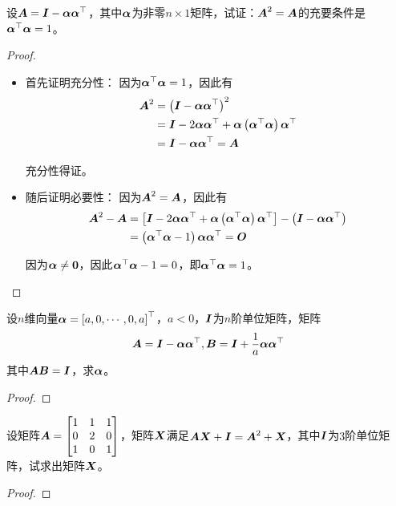\begin{problem}
设\(\mata=\mati-\vecal\vecal^\top\)，其中\(\vecal\)为非零\(n\times1\)矩阵，试证：\(\mata^2=\mata\)的充要条件是\(\vecal^\top\vecal=1\)。
\end{problem}
\begin{proof}
    \begin{itemize}
        \item 首先证明充分性：
              因为\(\vecal^\top\vecal=1\)，因此有
              \begin{align*}
                  \mata^2 & =\mypar{\mati-\vecal\vecal^\top}^2                                   \\
                          & =\mati-2\vecal\vecal^\top+\vecal\mypar{\vecal^\top\vecal}\vecal^\top \\
                          & =\mati-\vecal\vecal^\top=\mata
              \end{align*}

              充分性得证。

        \item 随后证明必要性：
              因为\(\mata^2=\mata\)，因此有
              \begin{align*}
                  \mata^2-\mata & =\mat{\mati-2\vecal\vecal^\top+\vecal\mypar{\vecal^\top\vecal}\vecal^\top}-\mypar{\mati-\vecal\vecal^\top} \\
                                & =\mypar{\vecal^\top\vecal-1}\vecal\vecal^\top=\mato
              \end{align*}

              因为\(\vecal\neq\veczero\)，因此\(\vecal^\top\vecal-1=0\)，即\(\vecal^\top\vecal=1\)。
    \end{itemize}
\end{proof}

\begin{problem}
设\(n\)维向量\(\vecal=\myvec{a,0,\cdots,0,a}\)，\(a<0\)，\(\mati\)为\(n\)阶单位矩阵，矩阵
\begin{equation*}
    \mata=\mati-\vecal\vecal^\top,\matb=\mati+\frac{1}{a}\vecal\vecal^\top
\end{equation*}
其中\(\mata\matb=\mati\)，求\(\vecal\)。
\end{problem}
\begin{proof}

\end{proof}

\begin{problem}
设矩阵\(\mata=\begin{bmatrix}1&1&1\\0&2&0\\1&0&1\end{bmatrix}\)，矩阵\(\matx\)满足\(\mata\matx+\mati=\mata^2+\matx\)，其中\(\mati\)为\(3\)阶单位矩阵，试求出矩阵\(\matx\)。
\end{problem}
\begin{proof}

\end{proof}

